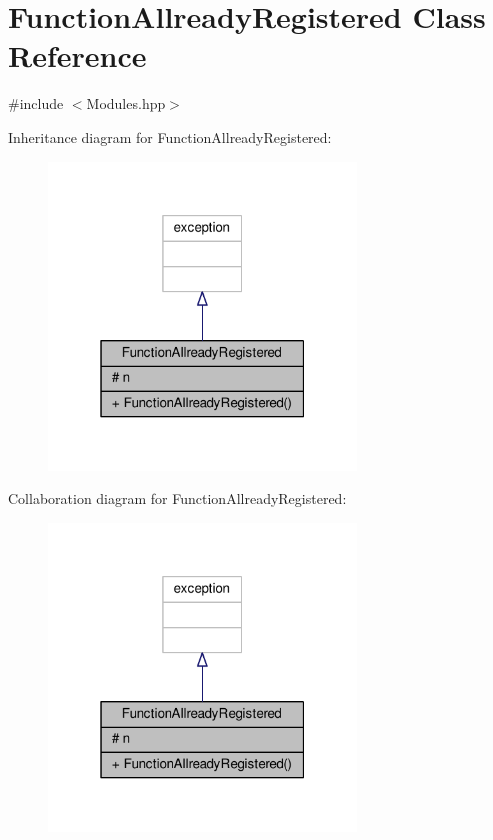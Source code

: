 \hypertarget{class_function_allready_registered}{}\section{Function\+Allready\+Registered Class Reference}
\label{class_function_allready_registered}


{\ttfamily \#include $<$Modules.\+hpp$>$}



Inheritance diagram for Function\+Allready\+Registered\+:\nopagebreak
\begin{figure}[H]
\begin{center}
\leavevmode
\includegraphics[width=232pt]{class_function_allready_registered__inherit__graph}
\end{center}
\end{figure}


Collaboration diagram for Function\+Allready\+Registered\+:\nopagebreak
\begin{figure}[H]
\begin{center}
\leavevmode
\includegraphics[width=232pt]{class_function_allready_registered__coll__graph}
\end{center}
\end{figure}

